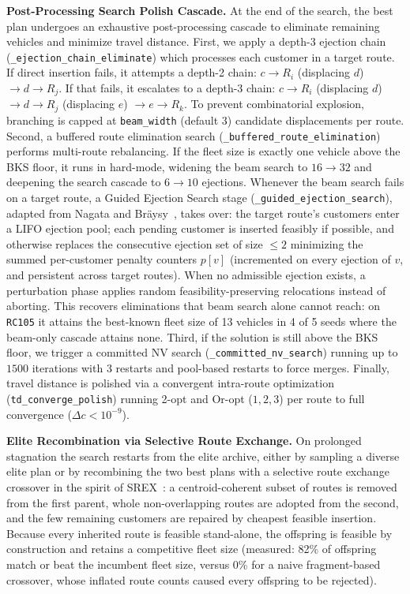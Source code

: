 \documentclass[journal]{IEEEtran}
\begin{document}
\textbf{Post-Processing Search Polish Cascade.}
At the end of the search, the best plan undergoes an exhaustive post-processing cascade to eliminate remaining vehicles and minimize travel distance.
First, we apply a depth-3 ejection chain (\texttt{\_ejection\_chain\_eliminate}) which processes each customer in a target route. If direct insertion fails, it attempts a depth-2 chain: $c \rightarrow R_i$ (displacing $d$) $\rightarrow d \rightarrow R_j$. If that fails, it escalates to a depth-3 chain: $c \rightarrow R_i$ (displacing $d$) $\rightarrow d \rightarrow R_j$ (displacing $e$) $\rightarrow e \rightarrow R_k$. To prevent combinatorial explosion, branching is capped at \texttt{beam\_width} (default $3$) candidate displacements per route.
Second, a buffered route elimination search (\texttt{\_buffered\_route\_elimination}) performs multi-route rebalancing. If the fleet size is exactly one vehicle above the BKS floor, it runs in hard-mode, widening the beam search to $16 \to 32$ and deepening the search cascade to $6 \to 10$ ejections.
Whenever the beam search fails on a target route, a Guided Ejection Search stage (\texttt{\_guided\_ejection\_search}), adapted from Nagata and Br\"aysy~\cite{nagata2009ges}, takes over: the target route's customers enter a LIFO ejection pool; each pending customer is inserted feasibly if possible, and otherwise replaces the consecutive ejection set of size $\le 2$ minimizing the summed per-customer penalty counters $p[v]$ (incremented on every ejection of $v$, and persistent across target routes). When no admissible ejection exists, a perturbation phase applies random feasibility-preserving relocations instead of aborting. This recovers eliminations that beam search alone cannot reach: on \texttt{RC105} it attains the best-known fleet size of 13 vehicles in 4 of 5 seeds where the beam-only cascade attains none.
Third, if the solution is still above the BKS floor, we trigger a committed NV search (\texttt{\_committed\_nv\_search}) running up to $1500$ iterations with $3$ restarts and pool-based restarts to force merges.
Finally, travel distance is polished via a convergent intra-route optimization (\texttt{td\_converge\_polish}) running 2-opt and Or-opt ($1, 2, 3$) per route to full convergence ($\Delta c < 10^{-9}$).

\textbf{Elite Recombination via Selective Route Exchange.}
On prolonged stagnation the search restarts from the elite archive, either by sampling a diverse elite plan or by recombining the two best plans with a selective route exchange crossover in the spirit of SREX~\cite{nagata2010srex}: a centroid-coherent subset of routes is removed from the first parent, whole non-overlapping routes are adopted from the second, and the few remaining customers are repaired by cheapest feasible insertion. Because every inherited route is feasible stand-alone, the offspring is feasible by construction and retains a competitive fleet size (measured: 82\% of offspring match or beat the incumbent fleet size, versus 0\% for a naive fragment-based crossover, whose inflated route counts caused every offspring to be rejected).
\end{document}
